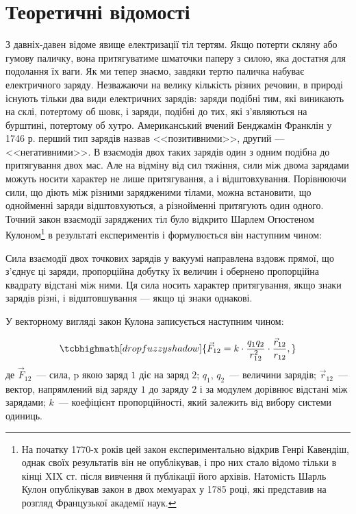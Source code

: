 
\section{Теоретичні відомості}

З давніх-давен відоме явище електризації тіл тертям. Якщо потерти скляну або гумову паличку, вона притягуватиме шматочки паперу з силою, яка достатня для подолання їх ваги. Як ми тепер знаємо, завдяки тертю паличка набуває електричного заряду. Незважаючи на велику кількість різних речовин, в природі існують тільки два види електричних зарядів: заряди подібні тим, які виникають на склі, потертому об шовк, і заряди, подібні до тих, які з'являються на бурштині, потертому об хутро. Американський вчений Бенджамін Франклін у 1746 р. перший тип зарядів назвав <<позитивними>>, другий --- <<негативними>>.  В взаємодія двох таких зарядів один з одним подібна до притягування двох мас. Але на відміну від сил тяжіння, сили між двома зарядами можуть носити характер не лише притягування, а і відштовхування. Порівнюючи сили, що діють між різними зарядженими тілами, можна встановити, що однойменні заряди відштовхуються, а різнойменні притягують один одного. Точний закон взаємодії заряджених тіл було відкрито Шарлем Огюстеном Кулоном\footnote{На початку 1770-х років цей закон експериментально відкрив Генрі Кавендіш, однак своїх результатів він не опублікував, і про них стало відомо тільки в кінці XIX ст. після вивчення й публікації його архівів. Натомість Шарль Кулон опублікував закон в двох мемуарах у 1785 році,  які представив на розгляд Французької академії наук.} в результаті експериментів і формулюється він наступним чином:

\begin{Definition}
Сила взаємодії двох точкових зарядів у вакуумі направлена вздовж прямої, що з'єднує ці заряди, пропорційна добутку їх величин і обернено пропорційна квадрату відстані між ними. Ця сила носить характер притягування, якщо знаки зарядів різні, і відштовшування --- якщо ці знаки однакові.
\end{Definition}

У векторному вигляді закон Кулона записується наступним чином:

\begin{equation}\label{key}
    \tcbhighmath[drop fuzzy shadow]{
    \vec{F}_{12}=k\cdot\frac{q_1  q_2}{r_{12}^2} \cdot \frac{\vec{r}_{12}}{r_{12}},
    }
\end{equation}
де $\vec{F}_{12}$ --- сила, p якою заряд $1$ діє на заряд $2$; $q_1$, $q_2$ --- величини зарядів; $\vec{r}_{12}$ --- вектор, напрямлений від заряду $1$ до заряду  $2$ і за модулем дорівнює відстані між зарядами; $k$ --- коефіцієнт пропорційності, який залежить від вибору системи одиниць. 

